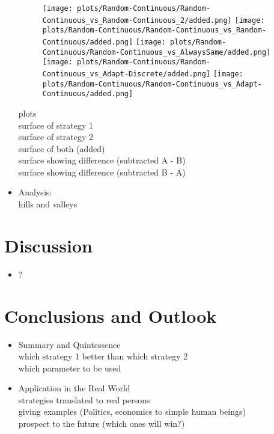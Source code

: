 \documentclass{article}
\begin{document}
\begin{itemize}
\begin{figure}[!h]
	\begin{minipage}[c]{0.80\textwidth}
		\texttt{[image: plots/Random-Continuous/Random-Continuous\_vs\_Random-Continuous\_2/added.png]}\hfill
		\texttt{[image: plots/Random-Continuous/Random-Continuous\_vs\_Random-Continuous/added.png]}\hfill
		\texttt{[image: plots/Random-Continuous/Random-Continuous\_vs\_AlwaysSame/added.png]}\hfill
		\texttt{[image: plots/Random-Continuous/Random-Continuous\_vs\_Adapt-Discrete/added.png]}\hfill 
		\texttt{[image: plots/Random-Continuous/Random-Continuous\_vs\_Adapt-Continuous/added.png]}\hfill
	\end{minipage}
\end{figure}

\newpage

		plots\\
		surface of strategy 1\\
		surface of strategy 2\\
		surface of both (added)\\
		surface showing difference (subtracted A - B)\\
		surface showing difference (subtracted B - A)\\

	\item Analysis:\\
		hills and valleys\\

\end{itemize}

\section{Discussion}
\begin{itemize}

	\item ?

\end{itemize}

\section{Conclusions and Outlook}
\begin{itemize}

	\item Summary and Quintessence\\
		which strategy 1 better than which strategy 2\\
		which parameter to be used\\

	\item Application in the Real World\\
		strategies translated to real persons\\
		giving examples (Politics, economics to simple human beings)\\
		prospect to the future (which ones will win?)

\end{itemize}
\end{document}
